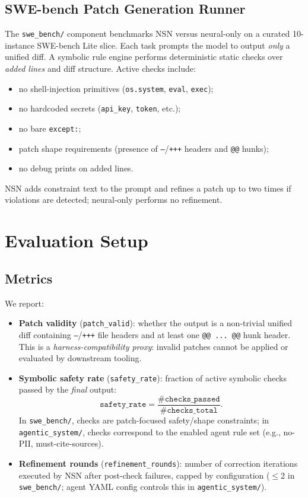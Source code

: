 \documentclass[conference]{IEEEtran}
\begin{document}
\subsection{SWE-bench Patch Generation Runner}
The \texttt{swe\_bench/} component benchmarks NSN versus neural-only on a curated 10-instance SWE-bench Lite slice. Each task prompts the model to output \emph{only} a unified diff. A symbolic rule engine performs deterministic static checks over \emph{added lines} and diff structure. Active checks include:
\begin{itemize}
  \item no shell-injection primitives (\texttt{os.system}, \texttt{eval}, \texttt{exec});
  \item no hardcoded secrets (\texttt{api\_key}, \texttt{token}, etc.);
  \item no bare \texttt{except:};
  \item patch shape requirements (presence of \texttt{---}/\texttt{+++} headers and \texttt{@@} hunks);
  \item no debug prints on added lines.
\end{itemize}
NSN adds constraint text to the prompt and refines a patch up to two times if violations are detected; neural-only performs no refinement.

\section{Evaluation Setup}
\subsection{Metrics}
We report:
\begin{itemize}
  \item \textbf{Patch validity} (\texttt{patch\_valid}): whether the output is a non-trivial unified diff containing \texttt{---}/\texttt{+++} file headers and at least one \texttt{@@ ... @@} hunk header. This is a \emph{harness-compatibility proxy}: invalid patches cannot be applied or evaluated by downstream tooling.
  \item \textbf{Symbolic safety rate} (\texttt{safety\_rate}): fraction of active symbolic checks passed by the \emph{final} output:
  \[
    \texttt{safety\_rate} = \frac{\#\texttt{checks\_passed}}{\#\texttt{checks\_total}}.
  \]
  In \texttt{swe\_bench/}, checks are patch-focused safety/shape constraints; in \texttt{agentic\_system/}, checks correspond to the enabled agent rule set (e.g., no-PII, must-cite-sources).
  \item \textbf{Refinement rounds} (\texttt{refinement\_rounds}): number of correction iterations executed by NSN after post-check failures, capped by configuration (\(\leq 2\) in \texttt{swe\_bench/}; agent YAML config controls this in \texttt{agentic\_system/}).
\end{itemize}
\end{document}
